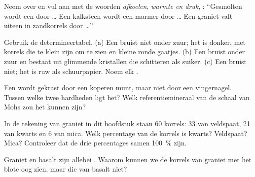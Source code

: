 \begin{exercise}[$\star$]\label{exo:g6:rocks-and-minerals:4}
Neem over en vul aan met de woorden \emph{afkoelen}, \emph{warmte en druk},
\emph{}: ``Gesmolten  wordt een  door
\ldots{} Een kalksteen wordt een marmer door \ldots{} Een graniet valt
uiteen in zandkorrels door \ldots''
\end{exercise}

\begin{exercise}[$\star\star$]\label{exo:g6:rocks-and-minerals:5}
Gebruik de determineertabel. (a) Een  bruist niet onder zuur; het
is donker, met korrels die te klein zijn om te zien en kleine ronde
gaatjes. (b) Een  bruist onder zuur en bestaat uit glimmende
kristallen die schitteren als suiker. (c) Een  bruist niet; het
is ruw als schuurpapier. Noem elk .
\end{exercise}

\begin{exercise}[$\star\star$]\label{exo:g6:rocks-and-minerals:6}
Een  wordt gekrast door een koperen munt, maar niet door een
vingernagel. Tussen welke twee hardheden ligt het? Welk referentiemineraal
van de schaal van Mohs zou het kunnen zijn?
\end{exercise}

\begin{exercise}[$\star\star$]\label{exo:g6:rocks-and-minerals:7}
In de tekening van graniet in dit hoofdstuk staan 60 korrels: 33 van
veldspaat, 21 van kwarts en 6 van mica. Welk percentage van de korrels is
kwarts? Veldspaat? Mica? Controleer dat de drie percentages samen
100~\% zijn.
\end{exercise}

\begin{exercise}[$\star\star$]\label{exo:g6:rocks-and-minerals:8}
Graniet en basalt zijn allebei . Waarom kunnen we de
korrels van graniet met het blote oog zien, maar die van basalt niet?
\end{exercise}

